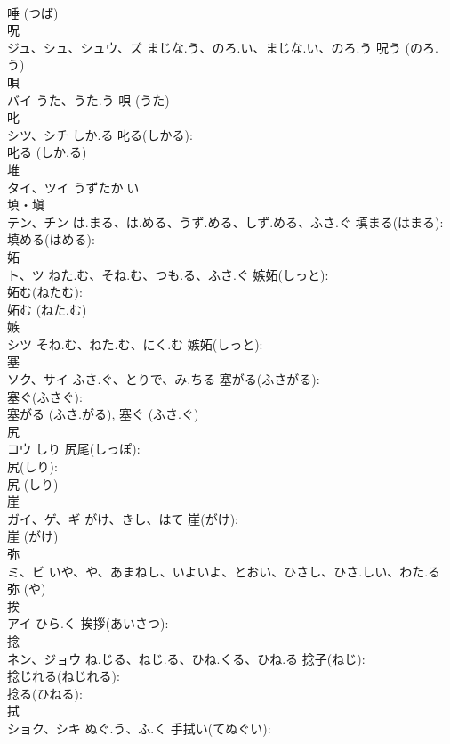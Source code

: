 \documentclass[8pt]{extreport}
\begin{document}
\begin{CJK}{UTF8}{min}
\\	唾 (つば)
\\	呪			
\\	ジュ、シュ、シュウ、ズ	まじな.う、のろ.い、まじな.い、のろ.う		呪う (のろ.う)
\\	唄			
\\	バイ	うた、うた.う		唄 (うた)
\\	叱			
\\	シツ、シチ	しか.る	叱る(しかる): 
\\	叱る (しか.る)
\\	堆			
\\	タイ、ツイ	うずたか.い		
\\	填・塡			
\\	テン、チン	は.まる、は.める、うず.める、しず.める、ふさ.ぐ	填まる(はまる): 
\\	填める(はめる): 
\\	妬			
\\	ト、ツ	ねた.む、そね.む、つも.る、ふさ.ぐ	嫉妬(しっと): 
\\	妬む(ねたむ): 
\\	妬む (ねた.む)
\\	嫉			
\\	シツ	そね.む、ねた.む、にく.む	嫉妬(しっと): 
\\	塞			
\\	ソク、サイ	ふさ.ぐ、とりで、み.ちる	塞がる(ふさがる): 
\\	塞ぐ(ふさぐ): 
\\	塞がる (ふさ.がる), 塞ぐ (ふさ.ぐ)
\\	尻			
\\	コウ	しり	尻尾(しっぽ): 
\\	尻(しり): 
\\	尻 (しり)
\\	崖			
\\	ガイ、ゲ、ギ	がけ、きし、はて	崖(がけ): 
\\	崖 (がけ)
\\	弥			
\\	ミ、ビ	いや、や、あまねし、いよいよ、とおい、ひさし、ひさ.しい、わた.る		弥 (や)
\\	挨			
\\	アイ	ひら.く	挨拶(あいさつ): 
\\	捻			
\\	ネン、ジョウ	ね.じる、ねじ.る、ひね.くる、ひね.る	捻子(ねじ): 
\\	捻じれる(ねじれる): 
\\	捻る(ひねる): 
\\	拭			
\\	ショク、シキ	ぬぐ.う、ふ.く	手拭い(てぬぐい): 

\end{CJK}
\end{document}
